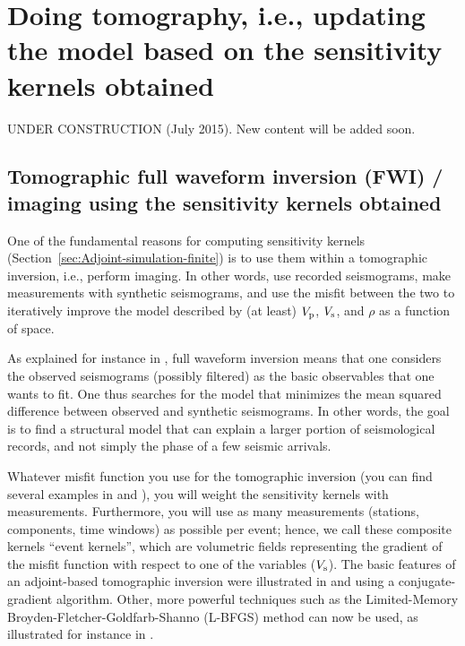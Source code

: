 \chapter[Doing tomography based on the sensitivity kernels obtained]{Doing tomography, i.e., updating the model based on the sensitivity kernels obtained}\label{cha:tomo}

UNDER CONSTRUCTION (July 2015). New content will be added soon.

\section{Tomographic full waveform inversion (FWI) / imaging using the sensitivity kernels obtained}

One of the fundamental reasons for computing sensitivity kernels (Section~\ref{sec:Adjoint-simulation-finite})
is to use them within a tomographic inversion, i.e., perform imaging. In other words, use
recorded seismograms, make measurements with synthetic seismograms,
and use the misfit between the two to iteratively improve the model
described by (at least) $V_{{\rm p}}$, $V_{{\rm s}}$, and $\rho$ as a function of space.

As explained for instance in \cite{MoChKoWa15},
full waveform inversion means that one considers the observed seismograms (possibly filtered) as the
basic observables that one wants to fit. One thus searches for the model that minimizes the mean squared difference between observed
and synthetic seismograms. In other words, the goal is to find a structural model that can explain a larger portion
of seismological records, and not simply the phase of a few seismic arrivals.

Whatever misfit function you use for the tomographic inversion (you can find several
examples in \citet{TrKoLi08} and \citet{TrTaLi05}), you will weight
the sensitivity kernels with measurements. Furthermore, you will use
as many measurements (stations, components, time windows) as possible
per event; hence, we call these composite kernels ``event kernels'',
which are volumetric fields representing the gradient of the misfit
function with respect to one of the variables (\eg $V_{{\rm s}}$).
The basic features of an adjoint-based tomographic inversion were
illustrated in \citet{TrKoLi08} and \citet{TaLiTr07} using a conjugate-gradient algorithm.
Other, more powerful techniques such as the Limited-Memory Broyden-Fletcher-Goldfarb-Shanno (L-BFGS) method can now be used,
as illustrated for instance in \cite{MoChKoWa15}.

